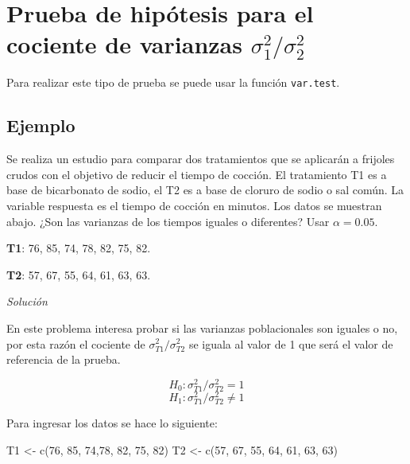 \documentclass[
]{book}
\makeatletter
\newenvironment{Shaded}{\begin{snugshade}}{\end{snugshade}}
\newcommand{\DecValTok}[1]{\textcolor[rgb]{0.00,0.00,0.81}{#1}}
\newcommand{\FunctionTok}[1]{\textcolor[rgb]{0.00,0.00,0.00}{#1}}
\newcommand{\NormalTok}[1]{#1}
\newcommand{\OtherTok}[1]{\textcolor[rgb]{0.56,0.35,0.01}{#1}}
\newenvironment{kframe}{%
\medskip{}
\setlength{\fboxsep}{.8em}
 \def\at@end@of@kframe{}%
 \ifinner\ifhmode%
  \def\at@end@of@kframe{\end{minipage}}%
  \begin{minipage}{\columnwidth}%
 \fi\fi%
 \def\FrameCommand##1{\hskip\@totalleftmargin \hskip-\fboxsep
 \colorbox{shadecolor}{##1}\hskip-\fboxsep
     \hskip-\linewidth \hskip-\@totalleftmargin \hskip\columnwidth}%
 \MakeFramed {\advance\hsize-\width
   \@totalleftmargin\z@ \linewidth\hsize
   \@setminipage}}%
 {\par\unskip\endMakeFramed%
 \at@end@of@kframe}
\renewenvironment{Shaded}{\begin{kframe}}{\end{kframe}}
\makeatother
\begin{document}
\hypertarget{prueba-de-hipuxf3tesis-para-el-cociente-de-varianzas-sigma_12-sigma_22}{%
\section{\texorpdfstring{Prueba de hipótesis para el cociente de varianzas \(\sigma_1^2 / \sigma_2^2\)}{Prueba de hipótesis para el cociente de varianzas \textbackslash sigma\_1\^{}2 / \textbackslash sigma\_2\^{}2}}\label{prueba-de-hipuxf3tesis-para-el-cociente-de-varianzas-sigma_12-sigma_22}}

Para realizar este tipo de prueba se puede usar la función \texttt{var.test}.

\hypertarget{ejemplo-69}{%
\subsection*{Ejemplo}\label{ejemplo-69}}

Se realiza un estudio para comparar dos tratamientos que se aplicarán a frijoles crudos con el objetivo de reducir el tiempo de cocción. El tratamiento T1 es a base de bicarbonato de sodio, el T2 es a base de cloruro de sodio o sal común. La variable respuesta es el tiempo de cocción en minutos. Los datos se muestran abajo. ¿Son las varianzas de los tiempos iguales o diferentes? Usar \(\alpha=0.05\).

\textbf{T1}: 76, 85, 74, 78, 82, 75, 82.

\textbf{T2}: 57, 67, 55, 64, 61, 63, 63.

\emph{Solución}

En este problema interesa probar si las varianzas poblacionales son iguales o no, por esta razón el cociente de \(\sigma_{T1}^2 / \sigma_{T2}^2\) se iguala al valor de 1 que será el valor de referencia de la prueba.

\[H_0: \sigma_{T1}^2 / \sigma_{T2}^2 = 1\]
\[H_1: \sigma_{T1}^2 / \sigma_{T2}^2 \neq 1\]

Para ingresar los datos se hace lo siguiente:

\begin{Shaded}
\begin{Highlighting}[]
\NormalTok{T1 }\OtherTok{\textless{}{-}} \FunctionTok{c}\NormalTok{(}\DecValTok{76}\NormalTok{, }\DecValTok{85}\NormalTok{, }\DecValTok{74}\NormalTok{,}\DecValTok{78}\NormalTok{, }\DecValTok{82}\NormalTok{, }\DecValTok{75}\NormalTok{, }\DecValTok{82}\NormalTok{) }
\NormalTok{T2 }\OtherTok{\textless{}{-}} \FunctionTok{c}\NormalTok{(}\DecValTok{57}\NormalTok{, }\DecValTok{67}\NormalTok{, }\DecValTok{55}\NormalTok{, }\DecValTok{64}\NormalTok{, }\DecValTok{61}\NormalTok{, }\DecValTok{63}\NormalTok{, }\DecValTok{63}\NormalTok{)}
\end{Highlighting}
\end{Shaded}
\end{document}
